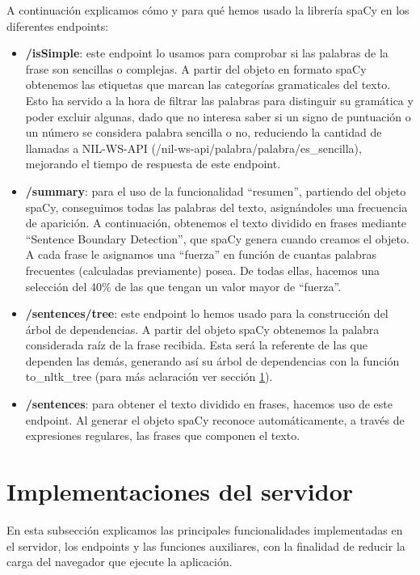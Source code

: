 A continuación explicamos cómo y para qué hemos usado la librería spaCy en los diferentes endpoints:

\begin{itemize}
	\item \textbf{/isSimple}: este endpoint lo usamos para comprobar si las palabras de la frase son sencillas o complejas. A partir del objeto en formato spaCy obtenemos las etiquetas que marcan las categorías gramaticales del texto. Esto ha servido a la hora de filtrar las palabras para distinguir su gramática y poder excluir algunas, dado que no interesa saber si un signo de puntuación o un número se considera palabra sencilla o no, reduciendo la cantidad de llamadas a NIL-WS-API (/nil-ws-api/palabra/{palabra}/es\_sencilla), mejorando el tiempo de respuesta de este endpoint.
	
	\item \textbf{/summary}: para el uso de la funcionalidad ``resumen'', partiendo del objeto spaCy, conseguimos todas las palabras del texto, asignándoles una frecuencia de aparición. A continuación, obtenemos el texto dividido en frases mediante ``Sentence Boundary Detection'', que spaCy genera cuando creamos el objeto. A cada frase le asignamos una ``fuerza'' en función de cuantas palabras frecuentes (calculadas previamente) posea. De todas ellas, hacemos una selección del 40\% de las que tengan un valor mayor de ``fuerza''.
	
	\item \textbf{/sentences/tree}: este endpoint lo hemos usado para la construcción del árbol de dependencias. A partir del objeto spaCy obtenemos la palabra considerada raíz de la frase recibida. Esta será la referente de las que dependen las demás, generando así su árbol de dependencias con la función to\_nltk\_tree (para más aclaración ver sección \ref{subsec:implementacionesServidor}).
	
	\item \textbf{/sentences}: para obtener el texto dividido en frases, hacemos uso de este endpoint. Al generar el objeto spaCy reconoce automáticamente, a través de expresiones regulares, las frases que componen el texto.
\end{itemize}

\section{Implementaciones del servidor}\label{subsec:implementacionesServidor}

En esta subsección explicamos las principales funcionalidades implementadas en el servidor, los endpoints y las funciones auxiliares, con la finalidad de reducir la carga del navegador que ejecute la aplicación.

